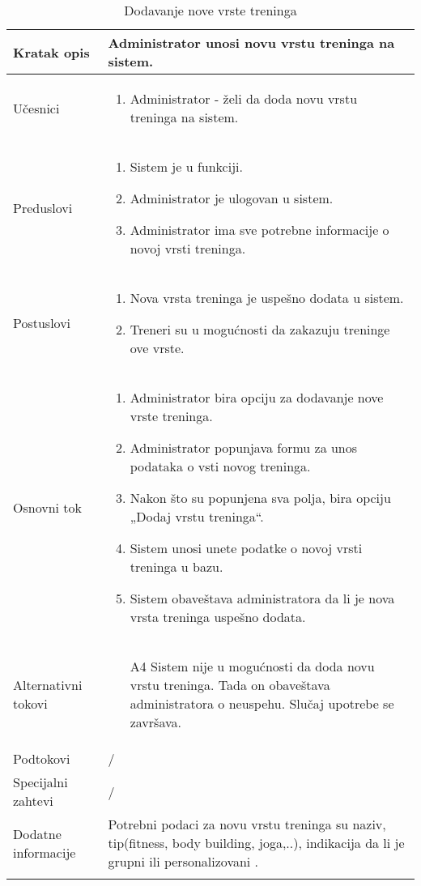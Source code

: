 \documentclass[../main.tex]{subfiles}
\begin{document}
\begin{longtable}{| p{} | p{} |} 

\hline
    Kratak opis &  Administrator unosi novu vrstu treninga na sistem.\\ 
\hline    
    Učesnici & 
    	\begin{enumerate}
        \item Administrator - želi da doda novu vrstu treninga na sistem.
     \end{enumerate}\\
\hline
   Preduslovi & \begin{enumerate}
       \item Sistem je u funkciji.
       \item Administrator je ulogovan u sistem.
       \item Administrator ima sve potrebne informacije o novoj vrsti treninga.
   \end{enumerate}\\
\hline  
    Postuslovi & \begin{enumerate}
        \item Nova vrsta treninga je uspešno dodata u sistem.
        \item Treneri su u mogućnosti da zakazuju treninge ove vrste.
    \end{enumerate}\\
\hline
    Osnovni tok & \begin{enumerate}
        \item Administrator bira opciju za dodavanje nove vrste treninga.
        \item Administrator popunjava formu za unos podataka o vsti novog treninga.
        \item Nakon što su popunjena sva polja, bira opciju „Dodaj vrstu treninga“.
        \item Sistem unosi unete podatke o novoj vrsti treninga u bazu.
        \item Sistem obaveštava administratora da li je nova vrsta treninga uspešno dodata.
    \end{enumerate}\\
\hline
    Alternativni tokovi & \begin{itemize}
        \item[A4]  Sistem nije u mogućnosti da doda novu vrstu treninga. Tada on obaveštava administratora o neuspehu. Slučaj upotrebe se završava.

    \end{itemize}\\
\hline
    Podtokovi & /\\
\hline
    Specijalni zahtevi & /\\
\hline
    Dodatne informacije & Potrebni podaci za novu vrstu treninga su naziv, tip(fitness, body building, joga,..), indikacija da li je grupni ili personalizovani .\\
\hline
\caption{Dodavanje nove vrste treninga} %
\end{longtable}
\end{document}
